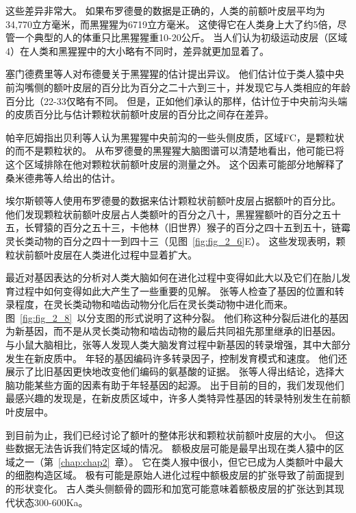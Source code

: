这些差异非常大。
如果布罗德曼的数据是正确的，人类的前额叶皮层平均为34,770立方毫米，而黑猩猩为6719立方毫米。
这使得它在人类身上大了约5倍，尽管一个典型的人的体重只比黑猩猩重10-20公斤。
当人们认为初级运动皮层（区域4）在人类和黑猩猩中的大小略有不同时，差异就更加显着了\cite{preuss2011human}。
\par


塞门德费里等人\cite{semendeferi2002humans}对布德曼关于黑猩猩的估计提出异议。
他们估计位于类人猿中央前沟嘴侧的额叶皮层的百分比为百分之二十六到三十，并发现它与人类相应的年龄百分比（22-33仅略有不同。
但是，正如他们承认的那样，估计位于中央前沟头端的皮质百分比与估计颗粒状前额叶皮层的百分比之间存在差异。
\par


帕辛厄姆\cite{passingham2008special}指出贝利等人\cite{bailey1950isocortex}认为黑猩猩中央前沟的一些头侧皮质，区域FC，是颗粒状的而不是颗粒状的。
从布罗德曼\cite{brodmann1912neue}的黑猩猩大脑图谱可以清楚地看出，他可能已将这个区域排除在他对颗粒状前额叶皮层的测量之外。
这个因素可能部分地解释了桑米德弗等人给出的估计。
\par


埃尔斯顿等人\cite{elston2007specialization}使用布罗德曼的数据来估计颗粒状前额叶皮层占据额叶的百分比。
他们发现颗粒状前额叶皮层占人类额叶的百分之八十，黑猩猩额叶的百分之五十五，长臂猿的百分之五十三，卡他林（旧世界）猴子的百分之四十五到五十，链霉灵长类动物的百分之四十一到四十三（见图~\ref{fig:fig_2_6}E）。
这些发现表明，颗粒状前额叶皮层在人类进化过程中显着扩大。
\par


最近对基因表达的分析对人类大脑如何在进化过程中变得如此大以及它们在胎儿发育过程中如何变得如此大产生了一些重要的见解。
张等人\cite{zhang2011accelerated}检查了基因的位置和转录程度，在灵长类动物和啮齿动物分化后在灵长类动物中进化而来。
图~\ref{fig:fig_2_8}~以分支图的形式说明了这种分裂。
他们称这种分裂后进化的基因为新基因，而不是从灵长类动物和啮齿动物的最后共同祖先那里继承的旧基因。
与小鼠大脑相比，张等人发现人类大脑发育过程中新基因的转录增强，其中大部分发生在新皮质中。
年轻的基因编码许多转录因子，控制发育模式和速度。
他们还展示了比旧基因更快地改变他们编码的氨基酸的证据。
张等人得出结论，选择大脑功能某些方面的因素有助于年轻基因的起源。
出于目前的目的，我们发现他们最感兴趣的发现是，在新皮质区域中，许多人类特异性基因的转录特别发生在前额叶皮层中。
\par


到目前为止，我们已经讨论了额叶的整体形状和颗粒状前额叶皮层的大小。
但这些数据无法告诉我们特定区域的情况。
额极皮层可能是最早出现在类人猿中的区域之一（第~\ref{chap:chap2}~章）。
它在类人猴中很小，但它已成为人类额叶中最大的细胞构造区域。
极有可能是原始人进化过程中额极皮层的扩张导致了前面提到的形状变化。
古人类头侧额骨的圆形和加宽可能意味着额极皮层的扩张达到其现代状态300-600Ka。
\par


